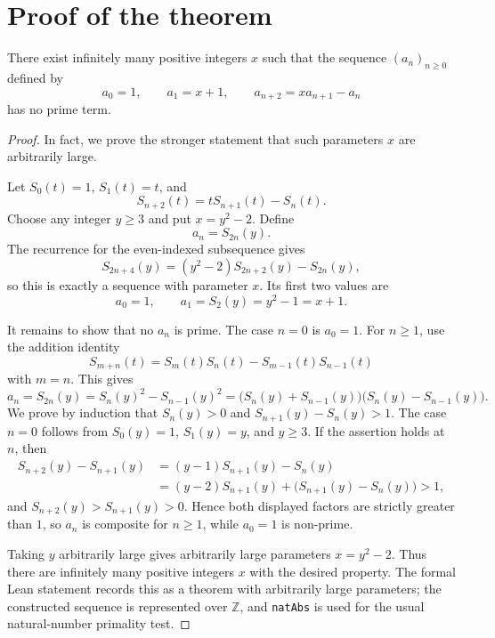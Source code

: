 
\section{Proof of the theorem}

\begin{theorem}
There exist infinitely many positive integers \(x\) such that the sequence
\((a_n)_{n\ge 0}\) defined by
\[
a_0=1,\qquad a_1=x+1,\qquad a_{n+2}=xa_{n+1}-a_n
\]
has no prime term.
\end{theorem}

\begin{proof}
In fact, we prove the stronger statement that such parameters \(x\) are
arbitrarily large.

Let \(S_0(t)=1\), \(S_1(t)=t\), and
\[
S_{n+2}(t)=tS_{n+1}(t)-S_n(t).
\]
Choose any integer \(y\ge 3\) and put \(x=y^2-2\).  Define
\[
a_n=S_{2n}(y).
\]
The recurrence for the even-indexed subsequence gives
\[
S_{2n+4}(y)=(y^2-2)S_{2n+2}(y)-S_{2n}(y),
\]
so this is exactly a sequence with parameter \(x\).  Its first two values are
\[
a_0=1,\qquad a_1=S_2(y)=y^2-1=x+1.
\]

It remains to show that no \(a_n\) is prime.  The case \(n=0\) is \(a_0=1\).
For \(n\ge 1\), use the addition identity
\[
S_{m+n}(t)=S_m(t)S_n(t)-S_{m-1}(t)S_{n-1}(t)
\]
with \(m=n\).  This gives
\[
a_n=S_{2n}(y)=S_n(y)^2-S_{n-1}(y)^2
      =\bigl(S_n(y)+S_{n-1}(y)\bigr)
       \bigl(S_n(y)-S_{n-1}(y)\bigr).
\]
We prove by induction that \(S_n(y)>0\) and
\(S_{n+1}(y)-S_n(y)>1\).  The case \(n=0\) follows from
\(S_0(y)=1\), \(S_1(y)=y\), and \(y\ge3\).  If the assertion holds at \(n\),
then
\[
\begin{aligned}
S_{n+2}(y)-S_{n+1}(y)
&=(y-1)S_{n+1}(y)-S_n(y)\\
&=(y-2)S_{n+1}(y)+\bigl(S_{n+1}(y)-S_n(y)\bigr)>1,
\end{aligned}
\]
and \(S_{n+2}(y)>S_{n+1}(y)>0\).  Hence both displayed factors are strictly
greater than \(1\), so \(a_n\) is composite for \(n\ge1\), while \(a_0=1\) is
non-prime.

Taking \(y\) arbitrarily large gives arbitrarily large parameters
\(x=y^2-2\).  Thus there are infinitely many positive integers \(x\) with the
desired property.  The formal Lean statement
records this as a theorem with arbitrarily large parameters; the constructed
sequence is represented over \(\mathbb Z\), and \texttt{natAbs} is used for the usual
natural-number primality test.
\end{proof}
